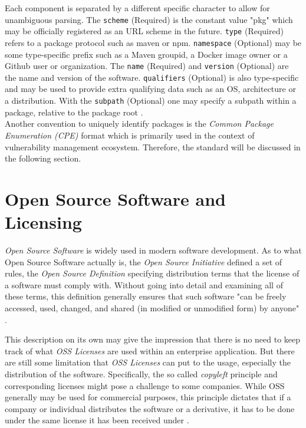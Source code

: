 Each component is separated by a different specific character to allow for unambiguous parsing. The \lstinline|scheme| (Required) is the constant value "pkg" which may be officially registered as an URL scheme in the future. \lstinline|type| (Required) refers to a package protocol such as maven or npm. \lstinline|namespace| (Optional) may be some type-specific prefix such as a Maven groupid, a Docker image owner or a Github user or organization. The \lstinline|name| (Required) and \lstinline|version| (Optional) are the name and version of the software. \lstinline|qualifiers| (Optional) is also type-specific and may be used to provide extra qualifying data such as an OS, architecture or a distribution. With the \lstinline|subpath| (Optional) one may specify a subpath within a package, relative to the package root \cite{purl}.\\

Another convention to uniquely identify packages is the \textit{Common Package Enumeration (CPE)} format which is primarily used in the context of vulnerability management ecosystem. Therefore, the standard will be discussed in the following section.

\section{Open Source Software and Licensing}
\textit{Open Source Software} is widely used in modern software development. As to what Open Source Software actually is, the \textit{Open Source Initiative} defined a set of rules, the \textit{Open Source Definition} specifying distribution terms that the license of a software must comply with. Without going into detail and examining all of these terms, this definition generally ensures that such software "can be freely accessed, used, changed, and shared (in modified or unmodified form) by anyone" \cite{OSI}.\par
This description on its own may give the impression that there is no need to keep track of what \textit{OSS Licenses} are used within an enterprise application. But there are still some limitation that \textit{OSS Licenses} can put to the usage, especially the distribution of the software. Specifically, the so called \textit{copyleft} principle and corresponding licenses might pose a challenge to some companies. While OSS generally may be used for commercial purposes, this principle dictates that if a company or individual distributes the software or a derivative, it has to be done under the same license it has been received under \cite{OSI}.\\

